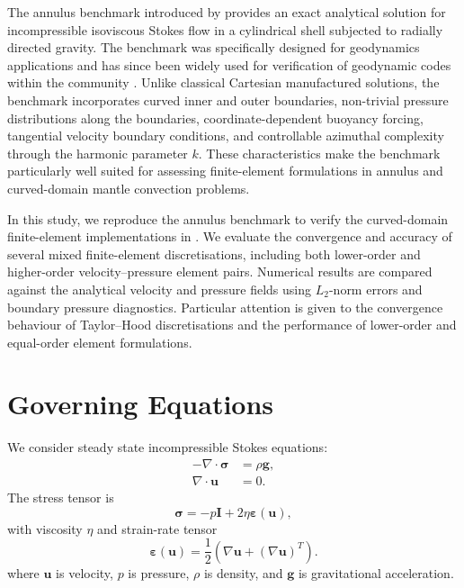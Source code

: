 \documentclass[gmd, manuscript]{copernicus}
\begin{document}
The annulus benchmark introduced by  provides an exact analytical solution
for incompressible isoviscous Stokes flow in a cylindrical shell subjected to
radially directed gravity. The benchmark was specifically designed for
geodynamics applications and has since been widely used for verification of
geodynamic codes within the community \citep{gassmoller2024}. Unlike classical
Cartesian manufactured solutions, the benchmark incorporates curved inner and
outer boundaries, non-trivial pressure distributions along the boundaries,
coordinate-dependent buoyancy forcing, tangential velocity boundary conditions,
and controllable azimuthal complexity through the harmonic parameter \(k\).
These characteristics make the benchmark particularly well suited for assessing
finite-element formulations in annulus and curved-domain mantle convection
problems.

In this study, we reproduce the  annulus
benchmark to verify the curved-domain finite-element implementations in
. We
evaluate the convergence and accuracy of several mixed finite-element
discretisations, including both lower-order and higher-order
velocity--pressure element pairs. Numerical results are compared against the
analytical velocity and pressure fields using \(L_2\)-norm errors and
boundary pressure diagnostics. Particular attention is given to the convergence
behaviour of Taylor--Hood discretisations and the performance of lower-order and
equal-order element formulations.

\section{Governing Equations}

We consider steady state incompressible Stokes equations:
\begin{subequations}
\begin{align}
  -\nabla \cdot \boldsymbol{\sigma} &= \rho \mathbf{g}, \\
  \nabla \cdot \mathbf{u} &= 0.
\end{align}
\end{subequations}
The stress tensor is
\begin{equation}
  \boldsymbol{\sigma} = -p\mathbf{I} + 2\eta\boldsymbol{\varepsilon}(\mathbf{u}),
\end{equation}
with viscosity \(\eta\) and strain-rate tensor
\begin{equation}
  \boldsymbol{\varepsilon}(\mathbf{u})
  =
  \frac{1}{2}\left(\nabla \mathbf{u} + (\nabla \mathbf{u})^T\right).
\end{equation}
where \(\mathbf{u}\) is velocity, \(p\) is pressure, \(\rho\) is density, and \(\mathbf{g}\) is gravitational acceleration.
\end{document}

